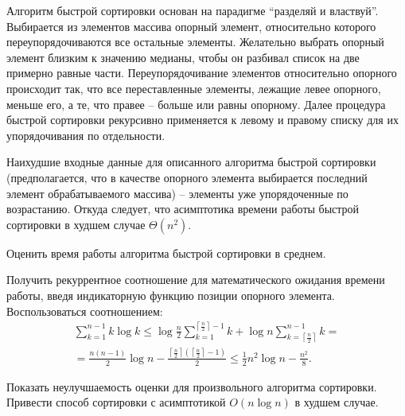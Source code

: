 \begin{problem}
\noindent Алгоритм быстрой сортировки основан на парадигме ``разделяй и властвуй''. Выбирается из элементов массива опорный элемент, относительно которого переупорядочиваются все остальные элементы. Желательно выбрать опорный элемент близким к значению медианы, чтобы он разбивал список на две примерно равные части. Переупорядочивание элементов относительно опорного происходит так, что все переставленные элементы, лежащие левее опорного, меньше его, а те, что правее -- больше или равны опорному. Далее процедура быстрой сортировки рекурсивно применяется к левому и правому списку для их упорядочивания по отдельности.

Наихудшие входные данные для описанного алгоритма быстрой сортировки (предполагается, что в качестве опорного элемента выбирается последний элемент обрабатываемого массива) -- элементы уже упорядоченные по возрастанию. 
Откуда следует, что асимптотика времени работы быстрой сортировки в худшем случае $\Theta (n^{2} )$.

Оценить время работы алгоритма быстрой сортировки в среднем. 


\begin{ordre}
Получить рекуррентное соотношение для математического ожидания времени работы, введя индикаторную функцию позиции опорного элемента. 
Воспользоваться соотношением:
\[\begin{array}{l} {\sum _{k=1}^{n-1}k\log k \le \log \frac{n}{2} \sum _{k=1}^{\left\lceil \frac{n}{2} \right\rceil -1}k +\log n\sum _{k=\left\lceil \frac{n}{2} \right\rceil }^{n-1}k =} \\ {=\frac{n(n-1)}{2} \log n-\frac{\left\lceil \frac{n}{2} \right\rceil \left(\left\lceil \frac{n}{2} \right\rceil -1\right)}{2} \le \frac{1}{2} n^{2} \log n-\frac{n^{2} }{8} } .\end{array}\]
 
\end{ordre}

Показать неулучшаемость оценки для произвольного алгоритма сортировки. Привести способ сортировки с асимптотикой $O(n \log n)$ в худшем случае.

\end{problem}



